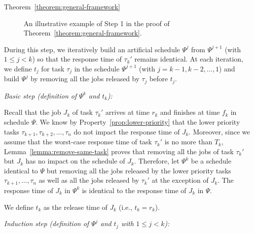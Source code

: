 \begin{appProof}{Theorem~\ref{theorem:general-framework}}


\begin{figure*}[t]
  \centering
  
\caption{An illustrative example of Step 1 in the proof of Theorem~\ref{theorem:general-framework}.}
\label{fig:example}  
\end{figure*}



During this step, we iteratively build an artificial schedule $\Psi^j$ from $\Psi^{j+1}$ (with $1 \leq j < k$) so that the response time of $\tau_{k}'$ remains identical. At each iteration, we define $t_j$ for task $\tau_j$ in the schedule $\Psi^{j+1}$ (with $j=k-1, k-2, \ldots, 1$) and build $\Psi^j$ by removing all the jobs released by $\tau_j$ before $t_j$.


\noindent\textit{Basic step (definition of $\Psi^k$ and $t_k$):} 

Recall that the job $J_{k}$ of task $\tau_k'$ arrives at time $r_k$ and finishes at time $f_k$ in schedule $\Psi$. We know by Property~\ref{prop:lower-priority} that the lower priority tasks $\tau_{k+1}, \tau_{k+2}, \ldots, \tau_n$ do not impact the response time of $J_{k}$. Moreover, since we assume that the worst-case response time of task $\tau_k'$ is no more than $T_k$, Lemma~\ref{lemma:remove-same-task} proves that removing all the jobs of task $\tau_k'$ but $J_{k}$ has no impact on the schedule of $J_{k}$. Therefore, let $\Psi^k$ be a schedule identical to $\Psi$ but removing all the jobs released by the lower priority tasks $\tau_{k+1}, \ldots, \tau_n$ as well as all the jobs released by $\tau_k'$ at the exception of $J_{k}$. The response time of $J_{k}$ in $\Psi^{k}$ is identical to the response time of $J_{k}$ in $\Psi$.

We define $t_k$ as the release time of $J_k$ (i.e., $t_k = r_k$).


\noindent\textit{Induction step (definition of $\Psi^j$ and $t_j$ with $1 \leq j < k$):}


\end{appProof}
